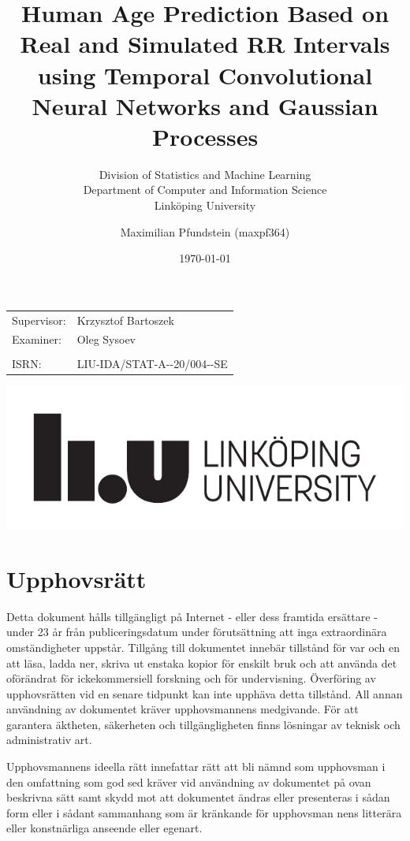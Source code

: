 \documentclass[11pt]{scrartcl}
\title{Human Age Prediction Based on Real and Simulated RR Intervals using Temporal Convolutional Neural Networks and Gaussian Processes}
\subtitle{Division of Statistics and Machine Learning \\ Department of Computer and Information Science \\ Linköping University}
\author{Maximilian Pfundstein (maxpf364)}
\date{\today}
\begin{document}

\maketitle

\begin{center}
	\begin{tabular}{ll}
		Supervisor: & Krzysztof Bartoszek \\
		Examiner: & Oleg Sysoev \\
		\\
		ISRN: & LIU-IDA/STAT-A-\phantom{}-20/004-\phantom{}-SE 
	\end{tabular}
\end{center}

\begin{center}
	\includegraphics{img/liu_primary_black_en.pdf}
\end{center}


\newpage

\section*{Upphovsrätt}

Detta dokument hålls tillgängligt på Internet - eller dess framtida ersättare - under 23 år från publiceringsdatum under förutsättning att inga extraordinära omständigheter uppstår. Tillgång till dokumentet innebär tillstånd för var och en att läsa, ladda ner, skriva ut enstaka kopior för enskilt bruk och att använda det oförändrat för ickekommersiell forskning och för undervisning. Överföring av upphovsrätten vid en senare tidpunkt kan inte upphäva detta tillstånd. All annan användning av dokumentet kräver upphovsmannens medgivande. För att garantera äktheten, säkerheten och tillgängligheten finns lösningar av teknisk och administrativ art.

Upphovsmannens ideella rätt innefattar rätt att bli nämnd som upphovsman i den omfattning som god sed kräver vid användning av dokumentet på ovan beskrivna sätt samt skydd mot att dokumentet ändras eller presenteras i sådan form eller i sådant sammanhang som är kränkande för upphovsman	nens litterära eller konstnärliga anseende eller egenart.
\end{document}
